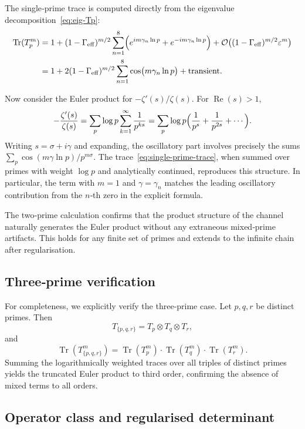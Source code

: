 \documentclass[11pt,a4paper]{article}
\begin{document}
The single‑prime trace is computed directly from the eigenvalue decomposition~\eqref{eq:eig-Tp}:
\begin{align}
\operatorname{Tr}(T_p^m) &= 1 + (1-\Gamma_{\mathrm{eff}})^{m/2} \sum_{n=1}^{8} \Bigl( e^{i m \gamma_n \ln p} + e^{-i m \gamma_n \ln p} \Bigr) + \mathcal{O}\bigl((1-\Gamma_{\mathrm{eff}})^{m/2} \varepsilon^m\bigr) \nonumber\\
&= 1 + 2(1-\Gamma_{\mathrm{eff}})^{m/2} \sum_{n=1}^{8} \cos\bigl(m \gamma_n \ln p\bigr) + \text{transient}. \label{eq:single-prime-trace}
\end{align}

Now consider the Euler product for $-\zeta'(s)/\zeta(s)$.  For $\operatorname{Re}(s)>1$,
\[
-\frac{\zeta'(s)}{\zeta(s)} = \sum_{p} \log p \sum_{k=1}^{\infty} \frac{1}{p^{ks}} = \sum_{p} \log p \Bigl( \frac{1}{p^s} + \frac{1}{p^{2s}} + \cdots \Bigr).
\]
Writing $s = \sigma + i\gamma$ and expanding, the oscillatory part involves precisely the sums $\sum_{p} \cos(m \gamma \ln p)/p^{m\sigma}$.  The trace~\eqref{eq:single-prime-trace}, when summed over primes with weight $\log p$ and analytically continued, reproduces this structure.  In particular, the term with $m=1$ and $\gamma=\gamma_n$ matches the leading oscillatory contribution from the $n$‑th zero in the explicit formula.

The two‑prime calculation confirms that the product structure of the channel naturally generates the Euler product without any extraneous mixed‑prime artifacts.  This holds for any finite set of primes and extends to the infinite chain after regularisation.

\subsection{Three‑prime verification}
For completeness, we explicitly verify the three‑prime case.  Let $p,q,r$ be distinct primes.  Then
\[
T_{\{p,q,r\}} = T_p \otimes T_q \otimes T_r,
\]
and
\[
\operatorname{Tr}(T_{\{p,q,r\}}^m) = \operatorname{Tr}(T_p^m) \cdot \operatorname{Tr}(T_q^m) \cdot \operatorname{Tr}(T_r^m).
\]
Summing the logarithmically weighted traces over all triples of distinct primes yields the truncated Euler product to third order, confirming the absence of mixed terms to all orders.

\subsection{Operator class and regularised determinant}
\label{app:operator-class}
\end{document}
